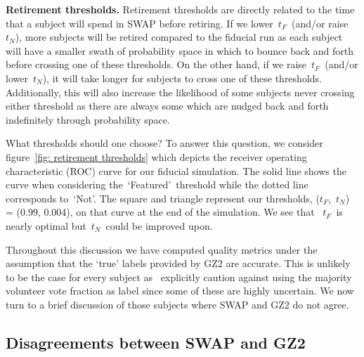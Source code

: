 \documentclass[twocolumn]{aastex6}
\newcommand{\tf}{$t_F$}
\newcommand{\tn}{$t_N$}
\newcommand{\feat}{`Featured'}
\newcommand{\notfeat}{`Not'}
\begin{document}
\textbf{Retirement thresholds.}
Retirement thresholds are directly related to the time that a subject will spend
in SWAP before retiring.  If we lower~\tf~(and/or raise~\tn), more subjects will be retired
compared to the fiducial run as each subject will have a smaller swath of probability space
in which to bounce back and forth before crossing one of these thresholds.
On the other hand, if we raise~\tf~(and/or lower~\tn), it will take longer for subjects
to cross one of these thresholds. Additionally, this will also increase the likelihood of
some subjects never crossing either threshold as there are always some 
which are nudged back and forth indefinitely through probability space.


What thresholds should one choose? To answer this question, we consider
figure~\ref{fig: retirement thresholds} which depicts the receiver operating 
characteristic (ROC) curve for our fiducial simulation. The solid line shows the 
curve when considering the~\feat~threshold  while the dotted line
corresponds to~\notfeat. The square and triangle represent our thresholds, 
(\tf,~\tn) = (0.99, 0.004), on that curve at the end of the simulation.  We see that 
~\tf~is nearly optimal but~\tn~could be improved upon. 


Throughout this discussion we have computed quality metrics under the assumption
that the `true' labels provided by GZ2 are accurate. 
This is unlikely to be the case for every subject as~\cite{Willett2013} explicitly caution against using 
the majority volunteer vote fraction as label since some of these are highly uncertain. 
We now turn to a brief discussion of those subjects where SWAP and GZ2 do not agree. 



\subsection{Disagreements between SWAP and GZ2}
\end{document}
